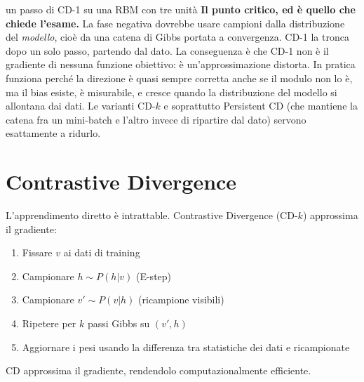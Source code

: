 \begin{esempiosvolto}{un passo di CD-1 su una RBM con tre unità}
\medskip
\textbf{Il punto critico, ed è quello che chiede l'esame.} La fase negativa dovrebbe usare campioni dalla distribuzione del \emph{modello}, cioè da una catena di Gibbs portata a convergenza. CD-1 la tronca dopo un solo passo, partendo dal dato. La conseguenza è che CD-1 non è il gradiente di nessuna funzione obiettivo: è un'approssimazione distorta. In pratica funziona perché la direzione è quasi sempre corretta anche se il modulo non lo è, ma il bias esiste, è misurabile, e cresce quando la distribuzione del modello si allontana dai dati. Le varianti CD-$k$ e soprattutto Persistent CD (che mantiene la catena fra un mini-batch e l'altro invece di ripartire dal dato) servono esattamente a ridurlo.
\end{esempiosvolto}

\section{Contrastive Divergence}

L'apprendimento diretto è intrattable. Contrastive Divergence (CD-$k$) approssima il gradiente:

\begin{enumerate}
  \item Fissare $v$ ai dati di training
  \item Campionare $h \sim P(h|v)$ (E-step)
  \item Campionare $v' \sim P(v|h)$ (ricampione visibili)
  \item Ripetere per $k$ passi Gibbs su $(v', h)$
  \item Aggiornare i pesi usando la differenza tra statistiche dei dati e ricampionate
\end{enumerate}

CD approssima il gradiente, rendendolo computazionalmente efficiente.

